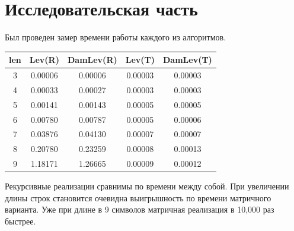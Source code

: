 \documentclass[12pt]{report}
\begin{document}
\chapter{Исследовательская часть}


Был проведен замер времени работы каждого из алгоритмов.

\begin{center}
	\begin{tabular}{|c c c c c|} 
 	\hline
	len & Lev(R) & DamLev(R) & Lev(T) & DamLev(T) \\ [0.5ex] 
 	\hline\hline
 	3 & 0.00006 & 0.00006 & 0.00003 & 0.00003\\
 	\hline
 	4 & 0.00033 & 0.00027 & 0.00003 & 0.00003\\
 	\hline
	5 & 0.00141 & 0.00143 & 0.00005 & 0.00005\\
	\hline
	6 & 0.00780 & 0.00787 & 0.00005 & 0.00006\\
	\hline
	7 & 0.03876 & 0.04130 & 0.00007 & 0.00007\\
	\hline
	8 & 0.20780 & 0.23259 & 0.00008 & 0.00013\\
	\hline
	9 & 1.18171 & 1.26665 & 0.00009 & 0.00012\\
	\hline
	\end{tabular}
\end{center}







\par
Рекурсивные реализации сравнимы по времени между собой. При увеличении длины строк становится очевидна выигрышность по времени матричного варианта. Уже при длине в 9 символов матричная реализация в 10,000 раз быстрее.
\end{document}
